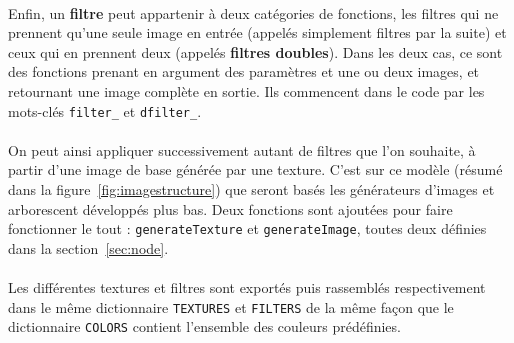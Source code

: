 \documentclass[a4paper]{article}
\begin{document}
\paragraph{}
Enfin, un \textbf{filtre} peut appartenir à deux catégories de fonctions, les filtres qui ne prennent qu'une seule image en entrée (appelés simplement filtres par la suite) et ceux qui en prennent deux (appelés \textbf{filtres doubles}). Dans les deux cas, ce sont des fonctions prenant en argument des paramètres et une ou deux images, et retournant une image complète en sortie. Ils commencent dans le code par les mots-clés \texttt{filter\_} et \texttt{dfilter\_}.

\paragraph{}
On peut ainsi appliquer successivement autant de filtres que l'on souhaite, à partir d'une image de base générée par une texture. C'est sur ce modèle (résumé dans la figure~\ref{fig:imagestructure}) que seront basés les générateurs d'images et arborescent développés plus bas. Deux fonctions sont ajoutées pour faire fonctionner le tout : \texttt{generateTexture} et \texttt{generateImage}, toutes deux définies dans la section~\ref{sec:node}.

\paragraph{}
Les différentes textures et filtres sont exportés puis rassemblés respectivement dans le même dictionnaire \texttt{TEXTURES} et \texttt{FILTERS} de la même façon que le dictionnaire \texttt{COLORS} contient l'ensemble des couleurs prédéfinies.
\end{document}

